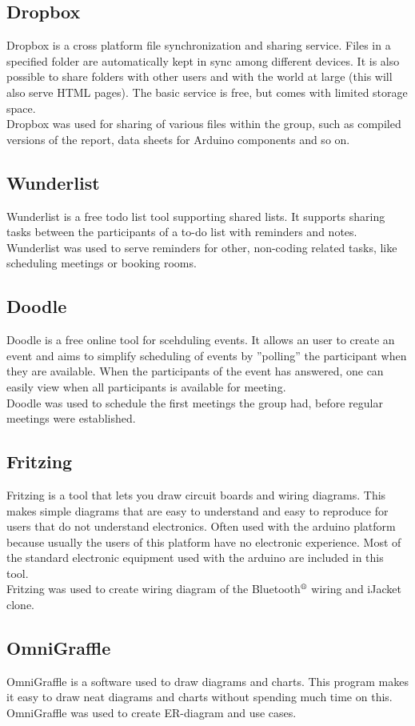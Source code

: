 \subsection{Dropbox}
Dropbox is a cross platform file synchronization and sharing service. Files in a specified folder are automatically kept in sync among different devices. It is also possible to share folders with other users and with the world at large (this will also serve HTML pages). The basic service is free, but comes with limited storage space.\\
Dropbox was used for sharing of various files within the group, such as compiled versions of the report, data sheets for Arduino components and so on. 

\subsection{Wunderlist}
Wunderlist is a free todo list tool supporting shared lists. It supports sharing tasks between the participants of a to-do list with reminders and notes.\\
Wunderlist was used to serve reminders for other, non-coding related tasks, like scheduling meetings or booking rooms.

\subsection{Doodle}
Doodle is a free online tool for scehduling events. It allows an user to create an event and aims to simplify scheduling of events by ''polling'' the participant when they are available. When the participants of the event has answered, one can easily view when all participants is available for meeting.\\
Doodle was used to schedule the first meetings the group had, before regular meetings were established. 

\subsection{Fritzing}
Fritzing is a tool that lets you draw circuit boards and wiring diagrams. This makes simple diagrams that are easy to understand and easy to reproduce for users that do not understand electronics. Often used with the arduino platform because usually the users of this platform have no electronic experience. Most of the standard electronic equipment used with the arduino are included in this tool.\\
Fritzing was used to create wiring diagram of the Bluetooth$\textsuperscript{\textregistered}$ wiring and iJacket clone.

\subsection{OmniGraffle}
OmniGraffle is a software used to draw diagrams and charts. This program makes it easy to draw neat diagrams and charts without spending much time on this.\\
OmniGraffle was used to create ER-diagram and use cases.
